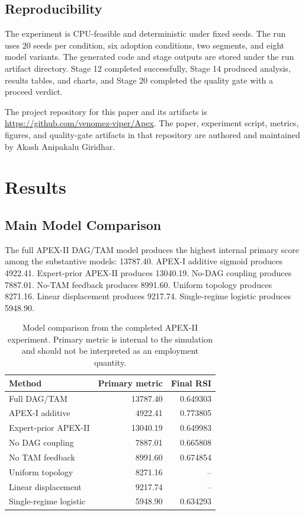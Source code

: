 \documentclass[10pt,conference]{IEEEtran}
\begin{document}
\subsection{Reproducibility}
The experiment is CPU-feasible and deterministic under fixed seeds. The run uses 20 seeds per condition, six adoption conditions, two segments, and eight model variants. The generated code and stage outputs are stored under the run artifact directory. Stage 12 completed successfully, Stage 14 produced analysis, results tables, and charts, and Stage 20 completed the quality gate with a proceed verdict.

The project repository for this paper and its artifacts is \url{https://github.com/venomez-viper/Apex}. The paper, experiment script, metrics, figures, and quality-gate artifacts in that repository are authored and maintained by Akash Anipakalu Giridhar.

\section{Results}
\subsection{Main Model Comparison}
The full APEX-II DAG/TAM model produces the highest internal primary score among the substantive models: 13787.40. APEX-I additive sigmoid produces 4922.41. Expert-prior APEX-II produces 13040.19. No-DAG coupling produces 7887.01. No-TAM feedback produces 8991.60. Uniform topology produces 8271.16. Linear displacement produces 9217.74. Single-regime logistic produces 5948.90.

\begin{table}[t]
\caption{Model comparison from the completed APEX-II experiment. Primary metric is internal to the simulation and should not be interpreted as an employment quantity.}
\centering
\begin{tabular}{lrr}
\toprule
Method & Primary metric & Final RSI \\
\midrule
Full DAG/TAM & 13787.40 & 0.649303 \\
APEX-I additive & 4922.41 & 0.773805 \\
Expert-prior APEX-II & 13040.19 & 0.649983 \\
No DAG coupling & 7887.01 & 0.665808 \\
No TAM feedback & 8991.60 & 0.674854 \\
Uniform topology & 8271.16 & -- \\
Linear displacement & 9217.74 & -- \\
Single-regime logistic & 5948.90 & 0.634293 \\
\bottomrule
\end{tabular}
\label{tab:comparison}
\end{table}
\end{document}

